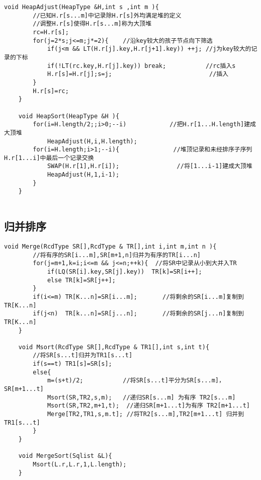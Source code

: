 \documentclass[UTF8]{ctexart}
\begin{document}
\begin{lstlisting}[style=v1]
    void HeapAdjust(HeapType &H,int s ,int m ){
        //已知H.r[s...m]中记录除H.r[s]外均满足堆的定义
        //调整H.r[s]使得H.r[s...m]称为大顶堆
        rc=H.r[s];
        for(j=2*s;j<=m;j*=2){    //沿key较大的孩子节点向下筛选
            if(j<m && LT(H.r[j].key,H.r[j+1].key)) ++j; //j为key较大的记录的下标
            if(!LT(rc.key,H.r[j].key)) break;           //rc插入s    
            H.r[s]=H.r[j];s=j;                           //插入   
        }
        H.r[s]=rc;
    }
 
    void HeapSort(HeapType &H ){
        for(i=H.length/2;;i>0;--i)            //把H.r[1...H.length]建成大顶堆          
            HeapAdjust(H,i,H.length);           
        for(i=H.length;i>1;--i){               //堆顶记录和未经排序子序列H.r[1...i]中最后一个记录交换 
            SWAP(H.r[1],H.r[i]);                //将[1...i-1]建成大顶堆
            HeapAdjust(H,1,i-1); 
        }
    }
 
\end{lstlisting}





\subsection{归并排序}

\begin{lstlisting}[style=v1]
    void Merge(RcdType SR[],RcdType & TR[],int i,int m,int n ){
        //将有序的SR[i...m],SR[m+1,n]归并为有序的TR[i...n]
        for(j=m+1,k=i;i<=m && j<=n;++k){  //将SR中记录从小到大并入TR
            if(LQ(SR[i].key,SR[j].key))  TR[k]=SR[i++];
            else TR[k]=SR[j++];
        }
        if(i<=m) TR[K...n]=SR[i...m];       //将剩余的SR[i...m]复制到TR[K...n]
        if(j<n)  TR[k...n]=SR[j...n];       //将剩余的SR[j...n]复制到TR[K...n]
    }

    void Msort(RcdType SR[],RcdType & TR1[],int s,int t){
        //将SR[s...t]归并为TR1[s...t]
        if(s==t) TR1[s]=SR[s];
        else{
            m=(s+t)/2;           //将SR[s...t]平分为SR[s...m]，SR[m+1...t]
            Msort(SR,TR2,s,m);   //递归SR[s...m] 为有序 TR2[s...m]  
            Msort(SR,TR2,m+1,t);  //递归SR[m+1...t]为有序 TR2[m+1...t] 
            Merge[TR2,TR1,s,m.t]; //将TR2[s...m],TR2[m+1...t] 归并到 TR1[s...t] 
        }
    }

    void MergeSort(Sqlist &L){
        Msort(L.r,L.r,1,L.length);
    }

\end{lstlisting}
\end{document}
